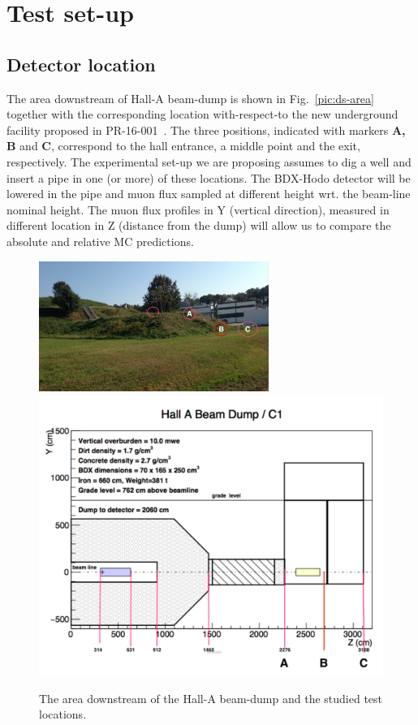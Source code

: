 \section{Test set-up}
\label{sec:setup}
\subsection{Detector location}
The area downstream of Hall-A beam-dump is shown in Fig.~\ref{pic:ds-area}  together with the corresponding location with-respect-to  
the new  underground facility proposed in PR-16-001~\cite{bdx-proposal}. The three positions, indicated with markers {\bf A, B}  and {\bf C},  correspond to the hall entrance, a middle point and the exit, respectively. The experimental set-up we are proposing  assumes to dig a well and insert a pipe in one (or more) of these locations. The BDX-Hodo detector will be lowered in the pipe and muon flux sampled at different height wrt. the beam-line nominal height. The muon flux profiles in Y (vertical direction), measured in  different location in Z (distance from the dump) will allow us to compare the absolute and relative MC predictions. 
\begin{figure}[h!] 
\center
\includegraphics[width=7.5cm]{figs/ds-area.pdf}  
\includegraphics[width=6.cm]{figs/test-plan.pdf}  
\caption{The area downstream of the Hall-A beam-dump and the studied test locations.}
\label{fig:ds-area}
\end{figure}

